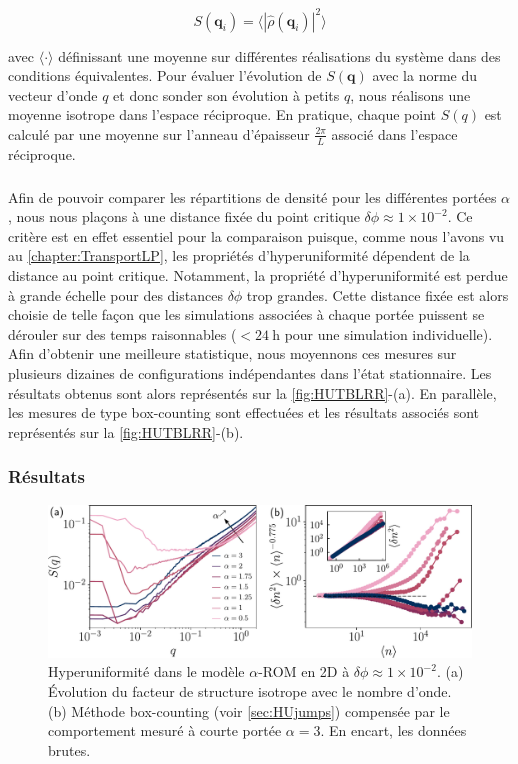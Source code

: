 \begin{equation}
	S(\mathbf{q}_i) = \langle|\hat{\rho}(\mathbf{q}_i)|^2\rangle
\end{equation}

\noindent avec $\langle \cdot \rangle$ définissant une moyenne sur différentes réalisations du système dans des conditions équivalentes. Pour évaluer l'évolution de $S(\mathbf{q})$ avec la norme du vecteur d'onde $q$ et donc sonder son évolution à petits $q$, nous réalisons une moyenne isotrope dans l'espace réciproque. En pratique, chaque point $S(q)$ est calculé par une moyenne sur l'anneau d'épaisseur $\frac{2\pi}{L}$ associé dans l'espace réciproque.

\subparagraph{}Afin de pouvoir comparer les répartitions de densité pour les différentes portées $\alpha$, nous nous plaçons à une distance fixée du point critique $\delta\phi \approx 1\times 10^{-2}$. Ce critère est en effet essentiel pour la comparaison puisque, comme nous l'avons vu au \autoref{chapter:TransportLP}, les propriétés d'hyperuniformité dépendent de la distance au point critique. Notamment, la propriété d'hyperuniformité est perdue à grande échelle pour des distances $\delta\phi$ trop grandes. Cette distance fixée est alors choisie de telle façon que les simulations associées à chaque portée puissent se dérouler sur des temps raisonnables ($<24~\text{h}$ pour une simulation individuelle). Afin d'obtenir une meilleure statistique, nous moyennons ces mesures sur plusieurs dizaines de configurations indépendantes dans l'état stationnaire. Les résultats obtenus sont alors représentés sur la \autoref{fig:HUTBLRR}-(a). En parallèle, les mesures de type box-counting sont effectuées et les résultats associés sont représentés sur la \autoref{fig:HUTBLRR}-(b).

\subsubsection{Résultats}

\begin{figure}[h]
	\centering
	\includegraphics[width=\textwidth]{Chapitre3/Figures/HU/HUTBLRR.pdf}
	\caption{Hyperuniformité dans le modèle $\alpha$-ROM en 2D à $\delta\phi \approx 1\times 10^{-2}$. (a) Évolution du facteur de structure isotrope avec le nombre d'onde. (b) Méthode box-counting (voir \autoref{sec:HUjumps}) compensée par le comportement mesuré à courte portée $\alpha = 3$. En encart, les données brutes.}
	\label{fig:HUTBLRR}
\end{figure}

